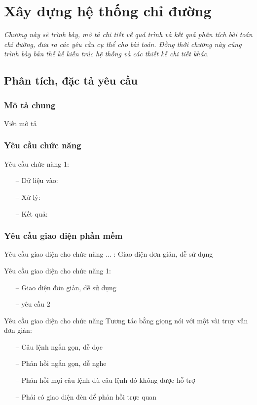 \chapter{Xây dựng hệ thống chỉ đường}
\label{Chapter4}

\emph{Chương này sẽ trình bày, mô tả chi tiết về quá trình và kết quả phân tích bài toán chỉ đường, đưa ra các yêu cầu cụ thể cho bài toán. Đồng thời chương này cũng trình bày bản thế kế kiến trúc hệ thống và các thiết kế chi tiết khác.}

\section{Phân tích, đặc tả yêu cầu}

\subsection{Mô tả chung}
Viết mô tả
\subsection{Yêu cầu chức năng}

Yêu cầu chức năng 1:
\begin{itemize}
    \item[--] Dữ liệu vào: 
    \item[--] Xử lý: 
    \item[--] Kết quả: 
\end{itemize}



\subsection{Yêu cầu giao diện phần mềm}

Yêu cầu giao diện cho chức năng ... : Giao diện đơn giản, dễ sử dụng

Yêu cầu giao diện cho chức năng 1:
\begin{itemize}
    \item[--] Giao diện đơn giản, dễ sử dụng
    \item[--] yêu cầu 2
\end{itemize}

Yêu cầu giao diện cho chức năng Tương tác bằng giọng nói với một vài truy vấn đơn giản:
\begin{itemize}
    \item[--] Câu lệnh ngắn gọn, dễ đọc
    \item[--] Phản hồi ngắn gọn, dễ nghe
    \item[--] Phản hồi mọi câu lệnh dù câu lệnh đó không được hỗ trợ
    \item[--] Phải có giao diện đèn để phản hồi trực quan
\end{itemize}

